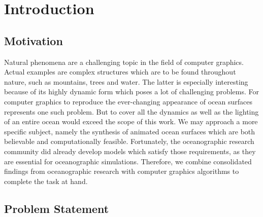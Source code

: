 \chapter{Introduction}
\label{ch:intro}
%
\section{Motivation}
\label{sec:motivation}

Natural phenomena are a challenging topic in the field of computer graphics.
Actual examples are complex structures which are to be found throughout nature,
such as mountains, trees and water. The latter is especially interesting
because of its highly dynamic form which poses a lot of challenging problems.
For computer graphics to reproduce the ever-changing appearance of ocean
surfaces represents one such problem. But to cover all the dynamics as well
as the lighting of an entire ocean would exceed the scope of this work.
We may approach a more specific subject, namely the synthesis of animated ocean
surfaces which are both believable and computationally feasible.
Fortunately, the oceanographic research community did already develop models
which satisfy those requirements, as they are essential for oceanographic
simulations. Therefore, we combine consolidated findings from oceanographic
research with computer graphics algorithms to complete the task at hand.




% 
% 
% 

\section{Problem Statement}
\label{sec:problem_statement}

